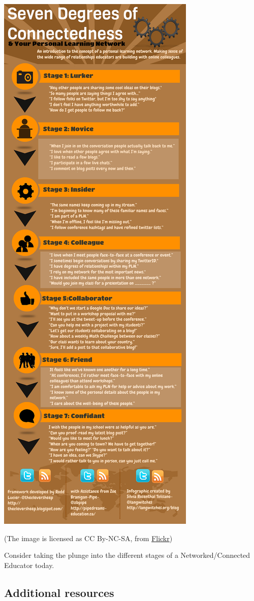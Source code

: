 \begin{center}
\includegraphics[width=.6\textwidth]{../pictures/k12-infographic.jpg} 
\end{center}

(The image is licensed as CC By-NC-SA, from
\href{http://www.flickr.com/photos/thecleversheep/7161689001/sizes/l/in/photostream/}{Flickr})

Consider taking the plunge into the different stages of a
Networked/Connected Educator today.

\subsection{Additional resources}


